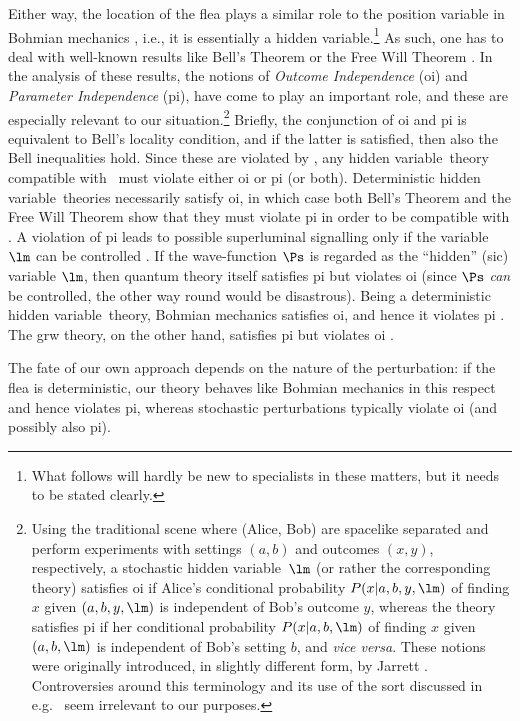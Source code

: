 \documentclass[12pt]{article}
\newcommand{\hv}{hidden variable}
\begin{document}
Either way, the location of the flea plays a similar role to the position variable in Bohmian mechanics \cite{CushingFine,DT}, i.e., it is essentially 
a hidden variable.\footnote{What follows will hardly be new to specialists in these matters, but it needs to be stated clearly.}
 As such, one has to deal with well-known results like Bell's Theorem \cite{Bell1,Bub,Maudlin} or the Free Will Theorem \cite{BS,Clifton,CK1,CK2,HR, Stairs}.
In the analysis of these results, the notions of \emph{Outcome Independence} ({\sc oi}) and \emph{Parameter Independence} ({\sc pi}), have come to play an important role, and these are especially relevant to our situation.\footnote{Using the traditional scene where (Alice, Bob) are spacelike separated and perform experiments with settings $(a,b)$ and outcomes $(x,y)$, respectively, a stochastic \hv\ $\lm$ (or rather the corresponding theory) satisfies {\sc oi} if Alice's conditional probability $P(x|a,b,y,\lm)$ of finding $x$ given $(a,b,y,\lm)$ is independent of Bob's outcome $y$, whereas the theory satisfies  {\sc pi} if her conditional probability $P(x|a,b,\lm)$ of finding $x$ given $(a,b,\lm)$ is independent of Bob's 
setting $b$, and \emph{vice versa}.
These notions  were originally introduced, in slightly different form, by Jarrett \cite{Jarrett}. Controversies around this terminology and its use of the sort discussed in e.g.\ \cite{Bub, Ghirardi,Maudlin,Norsen1,Seevinck} seem irrelevant to our purposes.} Briefly, the conjunction of {\sc oi} and {\sc pi} is equivalent to Bell's locality condition, and if the latter is satisfied, then also the Bell inequalities hold. Since these are violated by \qm, any \hv\ theory compatible with \qm\ must violate either {\sc oi} or  {\sc pi} (or both). Deterministic \hv\ theories necessarily satisfy {\sc oi}, in which case both Bell's Theorem and the  Free Will Theorem show that they must violate {\sc pi} in order to be compatible with \qm. 
A violation of {\sc pi} leads to possible superluminal signalling only if the variable $\lm$ can be controlled \cite{Maudlin,Norsen1}. 
If the wave-function $\Ps$ is regarded as the ``hidden'' (sic) variable $\lm$, then quantum theory itself satisfies {\sc pi} but violates {\sc oi} (since $\Ps$ \emph{can} be controlled, the other way round would be disastrous). Being a deterministic \hv\ theory, Bohmian mechanics satisfies  {\sc oi}, and hence it violates {\sc pi} \cite{Maudlin}. The {\sc grw} theory, on the other hand, satisfies  {\sc pi} but violates {\sc oi} \cite{BG2,Ghirardi,GBF,Norsen1}. 

The fate of our own approach depends on the nature of the perturbation: if the flea is deterministic, our theory behaves like Bohmian mechanics in this respect  and hence violates {\sc pi}, whereas stochastic perturbations  typically violate {\sc oi} (and possibly also {\sc pi}). 
\end{document}
